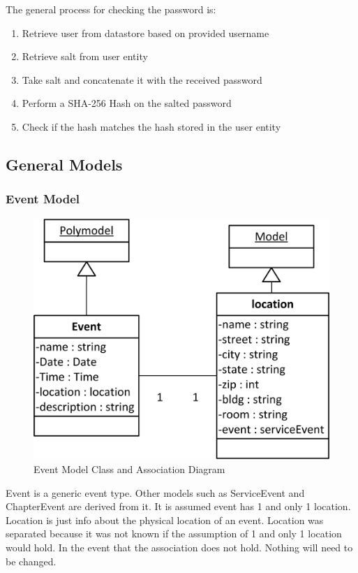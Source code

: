 \documentclass{article}
\begin{document}
The general process for checking the password is:

\begin{enumerate}
\item Retrieve user from datastore based on provided username
\item Retrieve salt from user entity
\item Take salt and concatenate it with the received password
\item Perform a SHA-256 Hash on the salted password
\item Check if the hash matches the hash stored in the user entity
\end{enumerate}

\subsection{General Models}

\subsubsection{Event Model}

\FloatBarrier
\begin{figure}[h!]
\centering
\includegraphics[scale=.65]{img/modelDiagrams/eventModel}
\caption{Event Model Class and Association Diagram}
\label{fig:eventModelDiagram}
\end{figure}
\FloatBarrier

Event is a generic event type. Other models such as ServiceEvent and ChapterEvent are derived from it. It is assumed event has 1 and only 1 location. Location is just info about the physical location of an event. Location was separated because it was not known if the assumption of 1 and only 1 location would hold. In the event that the association does not hold. Nothing will need to be changed.
\end{document}
